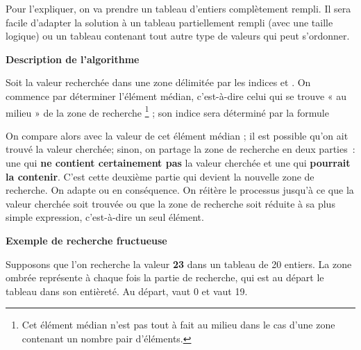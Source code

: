 		Pour l'expliquer,
		on va prendre un tableau d'entiers complètement rempli.
		Il sera facile d'adapter la solution à un tableau partiellement
		rempli (avec une taille logique) 
		ou un tableau contenant tout autre type de valeurs
		qui peut s'ordonner.
		
		{\sffamily\bfseries\upshape
		Description de l’algorithme}
	
		Soit  la valeur recherchée dans une zone délimitée 
		par les indices  et . 
		On commence par déterminer l’élément médian, 
		c’est-à-dire celui qui se trouve « au milieu » 
		de la zone de recherche%
		\footnote{%
			Cet élément médian n'est pas tout à fait au milieu 
			dans le cas d'une zone contenant un nombre pair d'éléments.
		} ; 
		son indice sera déterminé par la formule
	
		{\centering
		\par{}
		}
	
		On compare alors  avec la valeur de cet élément médian ; 
		il est possible qu’on ait trouvé la valeur cherchée; 
		sinon, on partage la zone de recherche en deux parties~: 
		une qui \textbf{ne contient certainement pas} la valeur cherchée 
		et une qui \textbf{pourrait la contenir}. 
		C’est cette deuxième partie qui devient la nouvelle zone de recherche. 
		On adapte  ou  en conséquence.
		On réitère le processus jusqu’à ce que la valeur cherchée soit trouvée ou
		que la zone de recherche soit réduite à sa plus simple expression,
		c’est-à-dire un seul élément.
			
		{\sffamily\bfseries\upshape
		Exemple de recherche fructueuse}

		Supposons que l’on recherche la valeur \textbf{23} 
		dans un tableau de 20 entiers. 
		La zone ombrée représente à chaque fois la partie de recherche, 
		qui est au départ le tableau dans son entièreté.
		Au départ,
		 vaut 0 et
		 vaut 19.

